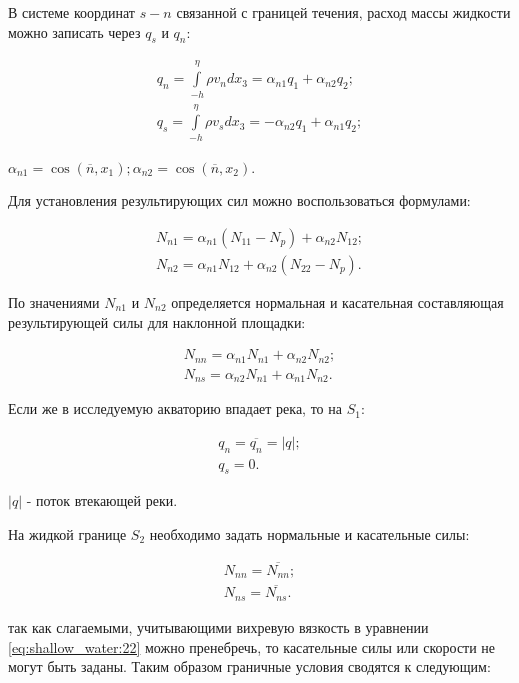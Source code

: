 \documentclass[14pt]{extreport}
\begin{document}
В системе координат $s-n$ связанной с границей течения, расход массы жидкости можно записать через $q_s$ и $q_n$:

\begin{equation}\label{eq:shallow_water:24}
\begin{aligned}
q_n=\int\limits^\eta_{-h} \rho v_n dx_3= \alpha_{n1}q_1+\alpha_{n2}q_2; \\
q_s=\int\limits^\eta_{-h} \rho v_s dx_3= -\alpha_{n2}q_1+\alpha_{n1}q_2;
\end{aligned}
\end{equation}

 $\alpha_{n1}=\cos(\overline{n},x_1); \alpha_{n2}=\cos(\overline{n},x_2).$

Для установления результирующих сил можно воспользоваться формулами:

\begin{eqnarray}
N_{n1}=\alpha_{n1}(N_{11}-N_{p})+\alpha_{n2}N_{12}; \nonumber\\
N_{n2}=\alpha_{n1}N_{12}+\alpha_{n2}(N_{22}-N_{p}).
\end{eqnarray}

По значениями $N_{n1}$ и $N_{n2}$ определяется нормальная и касательная составляющая результирующей силы для наклонной площадки:

\begin{eqnarray}
N_{nn}=\alpha_{n1}N_{n1}+\alpha_{n2}N_{n2}; \nonumber\\
N_{ns}=\alpha_{n2}N_{n1}+\alpha_{n1}N_{n2}.
\end{eqnarray}

Если же в исследуемую акваторию впадает река, то на $ S_1 $:

\begin{eqnarray}
q_n=\overline{q_n}=|q|; \nonumber\\
q_s=0.
\end{eqnarray}

 $|q|$ - поток втекающей
реки. 

На жидкой границе $ S_2 $ необходимо задать нормальные и касательные силы:

\begin{eqnarray}
N_{nn}=\overline{N_{nn}}; \nonumber\\
N_{ns}=\overline{N_{ns}}.
\end{eqnarray}

 так как слагаемыми, учитывающими вихревую вязкость в уравнении \ref{eq:shallow_water:22} можно пренебречь, то касательные силы или скорости не могут быть заданы. Таким образом граничные условия сводятся к следующим:
\end{document}
